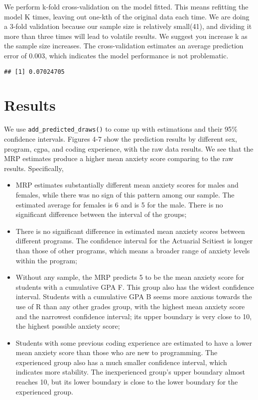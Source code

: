 \documentclass[
]{article}
\providecommand{\tightlist}{%
  \setlength{\itemsep}{0pt}\setlength{\parskip}{0pt}}
\begin{document}
We perform k-fold cross-validation on the model fitted. This means
refitting the model K times, leaving out one-kth of the original data
each time. We are doing a 3-fold validation because our sample size is
relatively small(41), and dividing it more than three times will lead to
volatile results. We suggest you increase k as the sample size
increases. The cross-validation estimates an average prediction error of
0.003, which indicates the model performance is not problematic.

\begin{verbatim}
## [1] 0.07024705
\end{verbatim}

\hypertarget{results}{%
\section{Results}\label{results}}

We use \texttt{add\_predicted\_draws()} to come up with estimations and
their 95\% confidence intervals. Figures 4-7 show the prediction results
by different sex, program, cgpa, and coding experience, with the raw
data results. We see that the MRP estimates produce a higher mean
anxiety score comparing to the raw results. Specifically,

\begin{itemize}
\tightlist
\item
  MRP estimates substantially different mean anxiety scores for males
  and females, while there was no sign of this pattern among our sample.
  The estimated average for females is 6 and is 5 for the male. There is
  no significant difference between the interval of the groups;
\item
  There is no significant difference in estimated mean anxiety scores
  between different programs. The confidence interval for the Actuarial
  Scitiest is longer than those of other programs, which means a broader
  range of anxiety levels within the program;
\item
  Without any sample, the MRP predicts 5 to be the mean anxiety score
  for students with a cumulative GPA F. This group also has the widest
  confidence interval. Students with a cumulative GPA B seems more
  anxious towards the use of R than any other grades group, with the
  highest mean anxiety score and the narrowest confidence interval; its
  upper boundary is very close to 10, the highest possible anxiety
  score;
\item
  Students with some previous coding experience are estimated to have a
  lower mean anxiety score than those who are new to programming. The
  experienced group also has a much smaller confidence interval, which
  indicates more stability. The inexperienced group's upper boundary
  almost reaches 10, but its lower boundary is close to the lower
  boundary for the experienced group.
\end{itemize}
\end{document}
